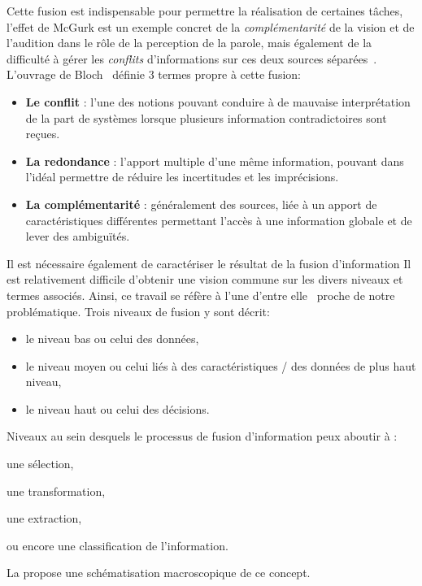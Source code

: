 Cette fusion est indispensable pour permettre la réalisation de certaines tâches, l'effet de McGurk est un exemple concret de la \textit{complémentarité} de la vision et de l'audition dans le rôle de la perception de la parole, mais également de la difficulté à gérer les \textit{conflits} d'informations sur ces deux sources séparées~\cite{Mcgurk1976}. L'ouvrage de Bloch~\cite{Bloch2003} définie 3 termes propre à cette fusion:
\begin{itemize}
    \item \textbf{Le conflit} : l'une des notions pouvant conduire à de mauvaise interprétation de la part de systèmes lorsque plusieurs information contradictoires sont reçues.
    \item \textbf{La redondance} : l'apport multiple d'une même information, pouvant dans l'idéal permettre de réduire les incertitudes et les imprécisions.
    \item \textbf{La complémentarité} : généralement des sources, liée à un apport de caractéristiques différentes permettant l'accès à une information globale et de lever des ambiguïtés.
\end{itemize}\par

Il est nécessaire également de caractériser le résultat de la fusion d'information
Il est relativement difficile d'obtenir une vision commune sur les divers niveaux et termes associés. Ainsi, ce travail se réfère à l'une d'entre elle~\cite{Dasarathy1997} proche de notre problématique. Trois niveaux de fusion y sont décrit:
\begin{itemize}
\item le niveau bas ou celui des données,
\item le niveau moyen ou celui liés à des caractéristiques / des données de plus haut niveau,
\item le niveau haut ou celui des décisions.
\end{itemize} Niveaux au sein desquels le processus de fusion d'information peux aboutir à :
\begin{inlinerate}
\item une sélection,
\item une transformation,
\item une extraction,
\item ou encore une classification de l'information.
\end{inlinerate} La  propose une schématisation macroscopique de ce concept.\par
 
